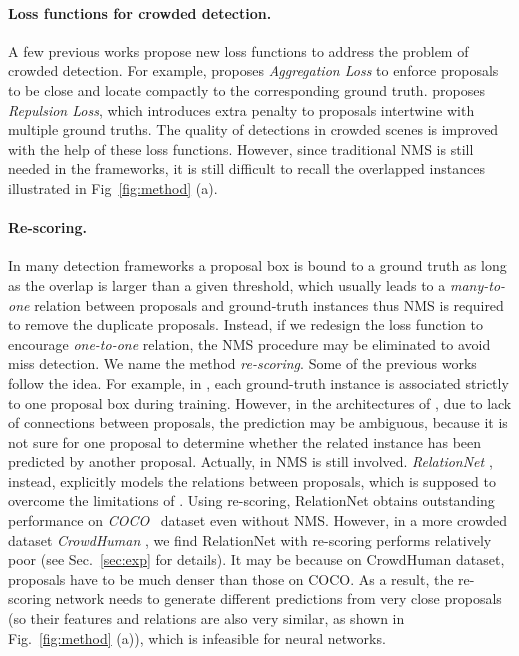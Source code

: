 \documentclass[10pt,twocolumn,letterpaper]{article}
\begin{document}
\paragraph{Loss functions for crowded detection. }
A few previous works propose new loss functions to address the problem of crowded detection. For example, \cite{zhang2018occlusion} proposes \emph{Aggregation Loss} to enforce proposals to be close and locate compactly to the corresponding ground truth. \cite{repulseloss} proposes \emph{Repulsion Loss}, which introduces extra penalty to proposals intertwine with multiple ground truths. The quality of detections in crowded scenes is improved with the help of these loss functions. However, since traditional NMS is still needed in the frameworks, it is still difficult to recall the overlapped instances illustrated in Fig~\ref{fig:method} (a).

\paragraph{Re-scoring. }
In many detection frameworks \cite{ren2015faster,liu2016ssd,lin2017feature,lin2017focal} a proposal box is bound to a ground truth as long as the overlap is larger than a given threshold, which usually leads to a \emph{many-to-one} relation between proposals and ground-truth instances thus NMS is required to remove the duplicate proposals. Instead, if we redesign the loss function to encourage \emph{one-to-one} relation, the NMS procedure may be eliminated to avoid miss detection. We name the method \emph{re-scoring}. Some of the previous works follow the idea. For example, in \cite{yolo,redmon2017yolo9000}, each ground-truth instance is associated strictly to one proposal box during training. However, in the architectures of \cite{yolo,redmon2017yolo9000}, due to lack of connections between proposals, the prediction may be ambiguous, because it is not sure for one proposal to determine whether the related instance has been predicted by another proposal. Actually, in \cite{yolo,redmon2017yolo9000} NMS is still involved. 
\emph{RelationNet} \cite{hu2017relation}, instead, explicitly models the relations between proposals, which is supposed to overcome the limitations of \cite{yolo,redmon2017yolo9000}. Using re-scoring, RelationNet obtains outstanding performance on \emph{COCO}~\cite{lin2014microsoft} dataset even without NMS. However, in a more crowded dataset \emph{CrowdHuman} \cite{shao2018crowdhuman}, we find RelationNet with re-scoring performs relatively poor (see Sec.~\ref{sec:exp} for details). It may be because on CrowdHuman dataset, proposals have to be much denser than those on COCO. As a result, the re-scoring network needs to generate different predictions from very close proposals (so their features and relations are also very similar, as shown in Fig.~\ref{fig:method} (a)), which is infeasible for neural networks. 
\end{document}
